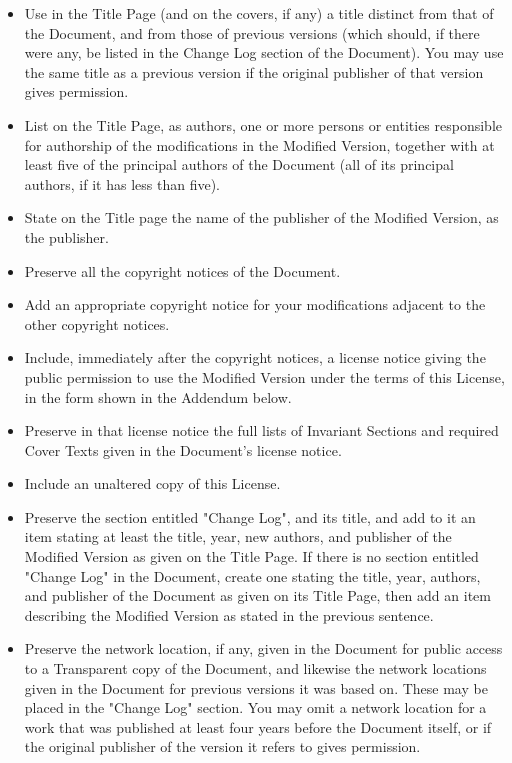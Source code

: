 	\begin{itemize}
		\item Use in the Title Page (and on the covers, if any) a title distinct from that of the Document, and from those of previous versions (which should, if there were any, be listed in the Change Log section of the Document). You may use the same title as a previous version if the original publisher of that version gives permission. 

		\item List on the Title Page, as authors, one or more persons or entities responsible for authorship of the modifications in the Modified Version, together with at least five of the principal authors of the Document (all of its principal authors, if it has less than five). 

		\item State on the Title page the name of the publisher of the Modified Version, as the publisher. 

		\item Preserve all the copyright notices of the Document. 

		\item Add an appropriate copyright notice for your modifications adjacent to the other copyright notices. 

		\item Include, immediately after the copyright notices, a license notice giving the public permission to use the Modified Version under the terms of this License, in the form shown in the Addendum below. 

		\item Preserve in that license notice the full lists of Invariant Sections and required Cover Texts given in the Document's license notice. 

		\item Include an unaltered copy of this License. 

		\item Preserve the section entitled "Change Log", and its title, and add to it an item stating at least the title, year, new authors, and publisher of the Modified Version as given on the Title Page. If there is no section entitled "Change Log" in the Document, create one stating the title, year, authors, and publisher of the Document as given on its Title Page, then add an item describing the Modified Version as stated in the previous sentence. 

		\item Preserve the network location, if any, given in the Document for public access to a Transparent copy of the Document, and likewise the network locations given in the Document for previous versions it was based on. These may be placed in the "Change Log" section. You may omit a network location for a work that was published at least four years before the Document itself, or if the original publisher of the version it refers to gives permission. 


\end{itemize}
